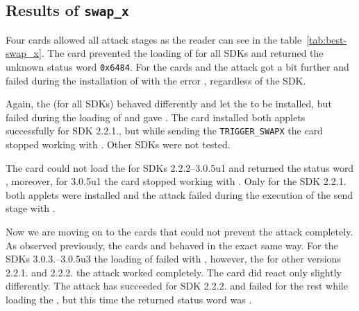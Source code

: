 \documentclass{../llncs/llncs}
\begin{document}


        \subsection{Results of \texttt{swap_x}}\label{subsec:swapx}

            Four cards allowed all attack stages as the reader can see in the table~\ref{tab:best-swap_x}.
            The card \Gcard prevented the loading of \vulnscap for all SDKs and returned the unknown status word \texttt{0x6484}. For the cards \Ccard and \Icard the attack got a bit further and failed during the installation of \vulnscap with the error \shortswconditionsnotsatisfied, regardless of the SDK.

            Again, the \Cnewcard (for all SDKs) behaved differently and let the \vulnscap to be installed, but failed during the loading of \appletscap and gave \shortswconditionsnotsatisfied. The card \Acard installed both applets successfully for SDK 2.2.1., but while sending the \texttt{TRIGGER_SWAPX} the card stopped working with \scardwunpoweredcard. Other SDKs were not tested.

        The card \Dcard could not load the \appletscap for SDKs 2.2.2--3.0.5u1 and returned the status word \shortswwrongdata, moreover, for 3.0.5u1 the card stopped working with \scardenottransacted. Only for the SDK 2.2.1. both applets were installed and the attack failed during the execution of the send stage with \shortswclanotsupported.


    Now we are moving on to the cards that could not prevent the attack completely. As observed previously, the cards \Fcard and \Hcard behaved in the exact same way. For the SDKs 3.0.3.--3.0.5u3 the loading of \appletscap failed with \shortswwrongdata, however, the for other versions 2.2.1. and 2.2.2. the attack worked completely. The card \Inewcard did react only slightly differently. The attack has succeeded for SDK 2.2.2. and failed for the rest while loading the \appletscap, but this time the returned status word was \shortswconditionsnotsatisfied.
\end{document}
